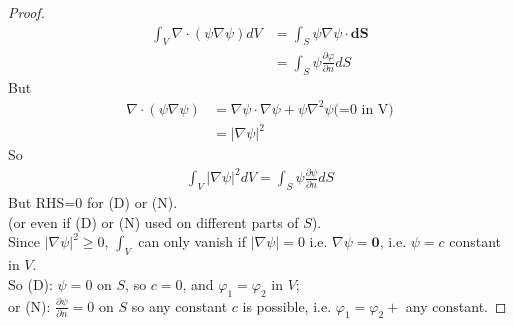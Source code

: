 \documentclass[a4paper]{article}
\begin{document}
\begin{thm}
\begin{proof}
\begin{equation*}
\begin{aligned}
\int_V \nabla\cdot\left(\psi\nabla\psi\right)dV &= \int_S \psi\nabla\psi\cdot\mathbf{dS}\\
&= \int_S \psi \frac{\partial\varphi}{\partial n} dS
\end{aligned}
\end{equation*}
But
\begin{equation*}
\begin{aligned}
\nabla\cdot\left(\psi\nabla\psi\right)&=\nabla\psi\cdot\nabla\psi + \psi\nabla^2\psi\text{(=0 in V)}\\
&= |\nabla\psi|^2
\end{aligned}
\end{equation*}
So
\begin{equation*}
\begin{aligned}
\int_V |\nabla\psi|^2 dV = \int_S \psi \frac{\partial \psi}{\partial n}dS
\end{aligned}
\end{equation*}
But RHS=0 for (D) or (N).\\
(or even if (D) or (N) used on different parts of $S$).\\
Since $|\nabla\psi|^2\geq 0$, $\int_V$ can only vanish if $|\nabla\psi|=0$ i.e. $\nabla\psi = \mathbf{0}$, i.e. $\psi = c$ constant in $V$.\\
So (D): $\psi = 0$ on $S$, so $c=0$, and $\varphi_1 = \varphi_2$ in $V$;\\
or (N): $\frac{\partial\psi}{\partial n} = 0$ on $S$ so any constant $c$ is possible, i.e. $\varphi_1 = \varphi_2 +$ any constant.
\end{proof}
\end{thm}
\end{document}
